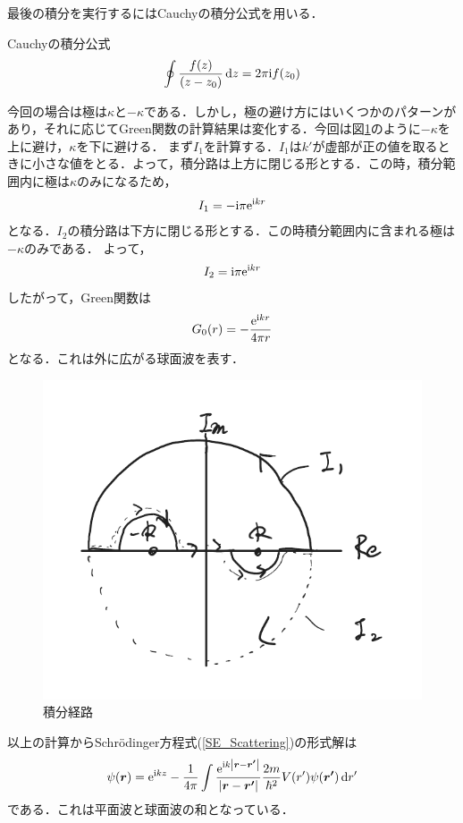 \documentclass{report}
\begin{document}
  最後の積分を実行するにはCauchyの積分公式を用いる．
  \begin{itembox}[l]{Cauchyの積分公式}
    \begin{align}
      \oint \frac{f(z)}{(z-z_0)}\dd{z} = 2\pi \mathrm{i} f(z_0)
    \end{align}
  \end{itembox}
  今回の場合は極は$\kappa$と$-\kappa$である．しかし，極の避け方にはいくつかのパターンがあり，それに応じてGreen関数の計算結果は変化する．今回は図\ref{Integral}のように$-\kappa$を上に避け，$\kappa$を下に避ける．
  まず$I_1$を計算する．$I_1$は$k'$が虚部が正の値を取るときに小さな値をとる．よって，積分路は上方に閉じる形とする．この時，積分範囲内に極は$\kappa$のみになるため，
  \begin{align}
    I_1 = -\mathrm{i}\pi\mathrm{e}^{\mathrm{i} kr}
  \end{align}
  となる．$I_2$の積分路は下方に閉じる形とする．この時積分範囲内に含まれる極は$-\kappa$のみである．
  よって，
  \begin{align}
    I_2 = \mathrm{i}\pi\mathrm{e}^{\mathrm{i} kr}
  \end{align}
  したがって，Green関数は
  \begin{align}
    G_0(r) = -\frac{\mathrm{e}^{\mathrm{i} kr}}{4\pi r}
  \end{align}
  となる．これは外に広がる球面波を表す．

  \begin{figure}[H]
    \centering
    \includegraphics[width=0.5\columnwidth]{fig/IntegralGreen.pdf}
    \caption{積分経路}
    \label{Integral}
  \end{figure}

  以上の計算からSchrödinger方程式(\ref{SE_Scattering})の形式解は
  \begin{align}
    \label{keishiki}
    \psi(\bm{r}) = \mathrm{e}^{\mathrm{i} kz} - \frac{1}{4\pi} \int \frac{\mathrm{e}^{\mathrm{i} k \abs{\bm{r} - \bm{r'}}}}{\abs{\bm{r} - \bm{r'}}} \frac{2m}{\hbar^2}V(r')\psi(\bm{r'}) \dd{r'}
  \end{align}
  である．これは平面波と球面波の和となっている．
\end{document}
